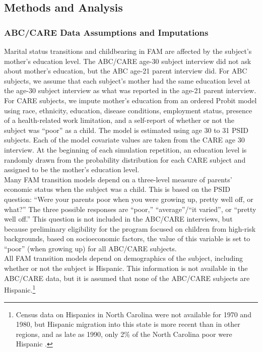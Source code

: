 \subsection{Methods and Analysis}

\subsubsection{ABC/CARE Data Assumptions and Imputations}
\label{section:FAM_ABC_impute}


\noindent Marital status transitions and childbearing in FAM are affected by the subject's mother's education level. The ABC/CARE age-30 subject interview did not ask about mother's education, but the ABC age-21 parent interview did.
For ABC subjects, we assume that each subject's mother had the same education level at the age-30 subject interview as what was reported in the age-21 parent interview. For CARE subjects, we impute mother's education from an ordered Probit model using race, ethnicity, education, disease conditions, employment status, presence of a health-related work limitation, and a self-report of whether or not the subject was ``poor'' as a child.  The model is estimated using age 30 to 31 PSID subjects.  Each of the model covariate values are taken from the CARE age 30 interview. At the beginning of each simulation repetition, an education level is randomly drawn from the probability distribution for each CARE subject and assigned to be the mother's education level.  \\

\noindent Many FAM transition models depend on a three-level measure of parents' economic status when the subject was a child.
This is based on the PSID question: ``Were your parents poor when you were growing up, pretty well off, or what?''
The three possible responses are ``poor,'' ``average''/``it varied'', or ``pretty well off.''
This question is not included in the ABC/CARE interviews, but because preliminary eligibility for the program focused on children from high-risk backgrounds, based on socioeconomic factors, the value of this variable is set to ``poor'' (when growing up) for all ABC/CARE subjects. \\

\noindent All FAM transition models depend on demographics of the subject, including whether or not the subject is Hispanic.
This information is not available in the ABC/CARE data, but it is assumed that none of the ABC/CARE subjects are Hispanic.\footnote{Census data on Hispanics in North Carolina were not available for 1970 and 1980, but Hispanic migration into this state is more recent than in other regions, and as late as 1990, only 2\% of the North Carolina poor were Hispanic \citep{Johnson_2003_Changing-Poverty}.} \\

